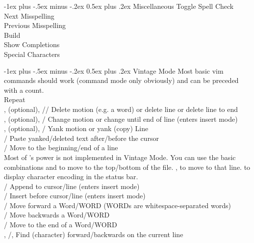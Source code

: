 \documentclass[10pt,landscape]{article}
\makeatletter
\renewcommand{\section}{\@startsection{section}{1}{0mm}%
                                {-1ex plus -.5ex minus -.2ex}%
                                {0.5ex plus .2ex}%
                                {\normalfont\large\bfseries}}
\makeatother
\begin{document}
\begin{multicols}{3}
\section{Miscellaneous}
 Toggle Spell Check \\
 Next Misspelling \\
 Previous Misspelling \\
 Build \\
\keys{\ctrl+\space} Show Completions \\
 Special Characters

\section{Vintage Mode}
Most basic vim commands should work (command mode only obviously) and can be preceded with a count. \\
 Repeat \\
,  (optional), // Delete motion (e.g. a word) or delete line or delete line to end  \\
,  (optional), / Change motion or change until end of line (enters insert mode) \\
,  (optional), / Yank motion or yank (copy) Line \\
/ Paste yanked/deleted text after/before the cursor \\
/\keys{\$} Move to the beginning/end of a line \\
 Most of 's power is not implemented in Vintage Mode. You can use the basic combinations  and  to move to the top/bottom of the file. ,  to move to that line.  to display character encoding in the status bar. \\
/ Append to cursor/line (enters insert mode) \\
/ Insert before cursor/line (enters insert mode) \\
/ Move forward a Word/WORD (WORDs are whitespace-separated words) \\
/ Move backwards a Word/WORD \\
/ Move to the end of a Word/WORD \\
, /,  Find (character) forward/backwards on the current line \\

\end{multicols}
\end{document}
